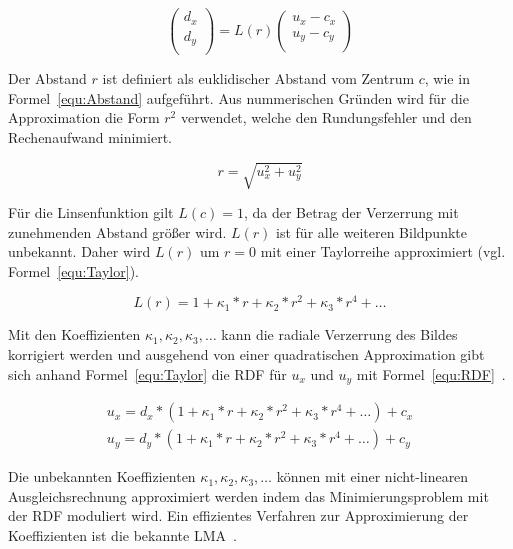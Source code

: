 \begin{equation}
\label{equ:BasicModel}
\begin{pmatrix}
d_x \\
d_y\\
\end{pmatrix} =
L(r)
\begin{pmatrix}
u_x-c_x\\
u_y -c_y\\
\end{pmatrix}
\end{equation}

Der Abstand $r$ ist definiert als euklidischer Abstand vom Zentrum $c$, wie in Formel~\ref{equ:Abstand} aufgeführt. Aus nummerischen Gründen wird für die Approximation die Form $r^2$ verwendet, welche den Rundungsfehler und den Rechenaufwand minimiert. 

\begin{equation}
\label{equ:Abstand}
r = \sqrt{u_x^2+u_y^2}
\end{equation}

 Für die Linsenfunktion gilt $L(c)=1$, da der Betrag der Verzerrung mit zunehmenden Abstand größer wird. $L(r)$ ist für alle weiteren Bildpunkte unbekannt. Daher wird $L(r)$ um $r=0$ mit einer Taylorreihe approximiert (vgl. Formel~\ref{equ:Taylor}). 
 
 \begin{equation}
 \label{equ:Taylor}
 L(r)=1+\kappa_1*r+\kappa_2*r^2+\kappa_3*r^4 + \dots
 \end{equation}

Mit den Koeffizienten $\kappa_1, \kappa_2, \kappa_3, \dots$ kann die radiale Verzerrung des Bildes korrigiert werden und ausgehend von einer quadratischen Approximation gibt sich anhand Formel~\ref{equ:Taylor} die RDF für $u_x$ und $u_y$ mit Formel~\ref{equ:RDF}~\cite{WangRaddist}.

\begin{equation}
\label{equ:RDF}
\begin{split}
u_x = d_x*(1+\kappa_1*r+\kappa_2*r^2+\kappa_3*r^4 + \dots) + c_x\\
u_y = d_y*(1+\kappa_1*r+\kappa_2*r^2+\kappa_3*r^4 + \dots) + c_y
\end{split}
\end{equation}

Die unbekannten Koeffizienten $\kappa_1, \kappa_2, \kappa_3, \dots$ können mit einer nicht-linearen Ausgleichsrechnung approximiert werden indem das Minimierungsproblem mit der RDF moduliert wird. Ein effizientes Verfahren zur Approximierung der Koeffizienten ist die bekannte LMA~\cite{LevMarquardt}.
